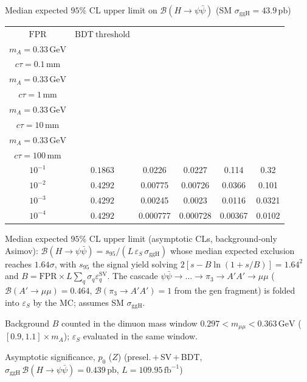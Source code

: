 \documentclass[10pt,a4paper]{article}
\begin{document}
{\vspace{12pt}

Median expected $95\%$ CL upper limit on $\mathcal{B}(H\to\psi\bar{\psi})$ (SM $\sigma_{\mathrm{ggH}}=43.9\,\mathrm{pb}$)

\begin{tabular}{cccccc}
\toprule
$\mathrm{FPR}$ & $\mathrm{BDT\ threshold}$ & \shortstack{$m_{\pi}=1\,\mathrm{GeV}$\\$m_{A}=0.33\,\mathrm{GeV}$\\$c\tau=0.1\,\mathrm{mm}$} & \shortstack{$m_{\pi}=1\,\mathrm{GeV}$\\$m_{A}=0.33\,\mathrm{GeV}$\\$c\tau=1\,\mathrm{mm}$} & \shortstack{$m_{\pi}=1\,\mathrm{GeV}$\\$m_{A}=0.33\,\mathrm{GeV}$\\$c\tau=10\,\mathrm{mm}$} & \shortstack{$m_{\pi}=1\,\mathrm{GeV}$\\$m_{A}=0.33\,\mathrm{GeV}$\\$c\tau=100\,\mathrm{mm}$} \\
\midrule
$10^{-1}$ & $0.1863$ & 0.0226 & 0.0227 & 0.114 & 0.32\\
$10^{-2}$ & $0.4292$ & 0.00775 & 0.00726 & 0.0366 & 0.101\\
$10^{-3}$ & $0.4292$ & 0.00245 & 0.0023 & 0.0116 & 0.0321\\
$10^{-4}$ & $0.4292$ & 0.000777 & 0.000728 & 0.00367 & 0.0102\\
\bottomrule
\end{tabular}

{\small Median expected $95\%$ CL upper limit (asymptotic CLs, background-only Asimov): $\mathcal{B}(H\to\psi\bar{\psi})=s_{95}/(L\,\varepsilon_S\,\sigma_{\mathrm{ggH}})$ whose median expected exclusion reaches $1.64\sigma$, with $s_{95}$ the signal yield solving $2[s-B\ln(1{+}s/B)]=1.64^2$ and $B=\mathrm{FPR}\times L\sum_q\sigma_q\varepsilon_q^{\mathrm{SV}}$. The cascade $\psi\bar{\psi}\to\ldots\to\pi_3\to A'A'\to\mu\mu$ ($\mathcal{B}(A'\to\mu\mu)=0.464$, $\mathcal{B}(\pi_3\to A'A')=1$ from the gen fragment) is folded into $\varepsilon_S$ by the MC; assumes SM $\sigma_{\mathrm{ggH}}$.}

{\small Background $B$ counted in the dimuon mass window $0.297<m_{\mu\mu}<0.363\,\mathrm{GeV}$ ($[0.9,1.1]\times m_A$); $\varepsilon_S$ evaluated in the same window.}

\vspace{12pt}

Asymptotic significance, $p_0$ ($Z$) (presel.\,$+$\,SV\,$+$\,BDT, $\sigma_{\mathrm{ggH}}\,\mathcal{B}(H\to\psi\bar{\psi})=0.439\,\mathrm{pb}$, $L=109.95\,\mathrm{fb}^{-1}$)

}
\end{document}
